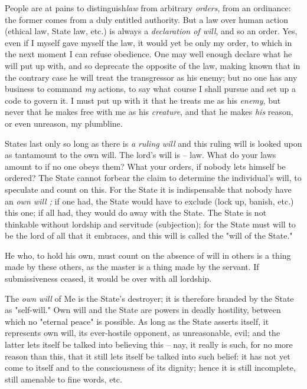 People are at pains to distinguish\textit{law} from arbitrary \textit{orders}, 
from an ordinance: the former comes from a duly entitled authority. But a law 
over human action (ethical law, State law, etc.) is always a 
\textit{declaration of will}, and so an order. Yes, even if I myself gave 
myself the law, it would yet be only my order, to which in the next moment I 
can refuse obedience. One may well enough declare what he will put up with, 
and so deprecate the opposite of the law, making known that in the contrary 
case he will treat the transgressor as his enemy; but no one has any business 
to command \textit{my} actions, to say what course I shall pursue and set up a 
code to govern it. I must put up with it that he treats me as his 
\textit{enemy}, but never that he makes free with me as his \textit{creature}, 
and that he makes \textit{his} reason, or even unreason, my plumbline.

States last only so long as there is \textit{a ruling will} and this ruling 
will is looked upon as tantamount to the own will. The lord's will is -- law. 
What do your laws amount to if no one obeys them? What your orders, if nobody 
lets himself be ordered? The State cannot forbear the claim to determine the 
individual's will, to speculate and count on this. For the State it is 
indispensable that nobody have an \textit{own will ;} if one had, the State 
would have to exclude (lock up, banish, etc.) this one; if all had, they would 
do away with the State. The State is not thinkable without lordship and 
servitude (subjection); for the State must will to be the lord of all that it 
embraces, and this will is called the "{}will of the State."{}

He who, to hold his own, must count on the absence of will in others is a 
thing made by these others, as the master is a thing made by the servant. If 
submissiveness ceased, it would be over with all lordship.

The \textit{own will} of Me is the State's destroyer; it is therefore branded 
by the State as "{}self-will."{} Own will and the State are powers in deadly 
hostility, between which no "{}eternal peace"{} is possible. As long as the 
State asserts itself, it represents own will, its ever-hostile opponent, as 
unreasonable, evil; and the latter lets itself be talked into believing this 
-- nay, it really is such, for no more reason than this, that it still lets 
itself be talked into such belief: it has not yet come to itself and to the 
consciousness of its dignity; hence it is still incomplete, still amenable to 
fine words, etc.

